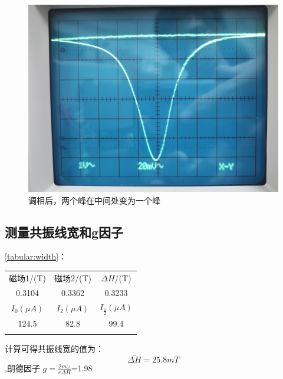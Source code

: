 \documentclass{buaaemp}
\begin{document}
\begin{figure}
        
            \includegraphics[width=\linewidth]{image/db2.jpg}
			\caption{调相后，两个峰在中间处变为一个峰}
			\label{figure:phase2}
		
	\end{figure}
	

	
	
\subsection{测量共振线宽和g因子}
 \ref{tabular:width}：
	\begin{center}
		\caption{共振线宽$\Delta H$的测量}
		\begin{tabular}{ccc}
			\hline\hline\noalign{\smallskip}
		磁场1/(T) & 磁场2/(T) & $\Delta H$/(T) \\
			\noalign{\smallskip}\hline\noalign{\smallskip}
			0.3104 & 0.3362 & 0.3233\\
            \hline\hline\noalign{\smallskip}
		$I_0 (\mu A)$ & $I_2(\mu A)$ & $I_{\frac{1}{2}} (\mu A)$ \\
		\noalign{\smallskip}\hline\noalign{\smallskip}
        124.5 &82.8 &99.4 \\
        \noalign{\smallskip}\hline\hline
		\end{tabular}
		\label{tabular:width}
	\end{center}
	
	计算可得共振线宽的值为：$$\bar{\Delta H}=25.8 mT$$,朗德因子 $g=\frac{2m \omega}{e \Delta H}$=1.98
	
	
	
\end{document}
